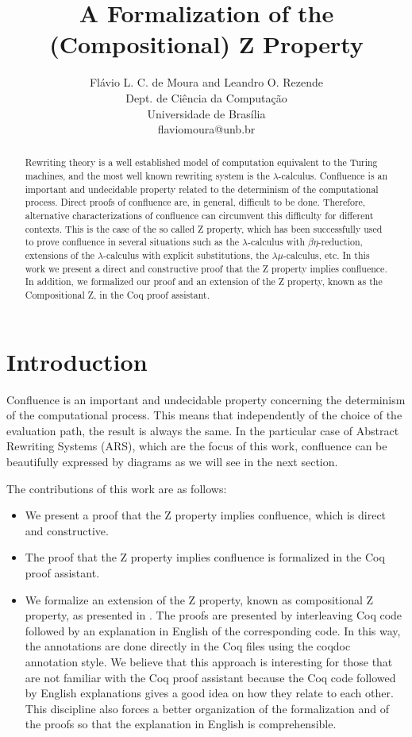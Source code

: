 \documentclass[a4paper]{article}
\title{A Formalization of the (Compositional) Z Property}
\author{
Flávio L. C. de Moura and Leandro O. Rezende\\ Dept. de Ciência da Computação\\
                Universidade de Brasília \\ flaviomoura@unb.br
}
\begin{document}
\maketitle

\begin{abstract}
  Rewriting theory is a well established model of computation
  equivalent to the Turing machines, and the most well known rewriting
  system is the $\lambda$-calculus. Confluence is an important and
  undecidable property related to the determinism of the computational
  process. Direct proofs of confluence are, in general, difficult to
  be done. Therefore, alternative characterizations of confluence can
  circumvent this difficulty for different contexts. This is the case
  of the so called Z property, which has been successfully used to
  prove confluence in several situations such as the
  $\lambda$-calculus with $\beta\eta$-reduction, extensions of the
  $\lambda$-calculus with explicit substitutions, the
  $\lambda\mu$-calculus, etc. In this work we present a direct and
  constructive proof that the Z property implies confluence.  In
  addition, we formalized our proof and an extension of the Z
  property, known as the Compositional Z, in the Coq proof assistant.
\end{abstract}
\vskip 32pt


\section{Introduction}

Confluence is an important and undecidable property concerning the
determinism of the computational process. This means that
independently of the choice of the evaluation path, the result is
always the same. In the particular case of Abstract Rewriting Systems
(ARS), which are the focus of this work, confluence can be beautifully
expressed by diagrams as we will see in the next section.

The contributions of this work are as follows:
\begin{itemize}
\item We present a proof that the Z property implies confluence,
  which is direct and constructive.
\item The proof that the Z property implies confluence is formalized
  in the Coq proof assistant. 
\item We formalize an extension of the Z property, known as
  compositional Z property, as presented in
  \cite{Nakazawa-Fujita2016}. The proofs are presented by interleaving
  Coq code followed by an explanation in English of the corresponding
  code. In this way, the annotations are done directly in the Coq
  files using the coqdoc annotation style. We believe that this
  approach is interesting for those that are not familiar with the Coq
  proof assistant because the Coq code followed by English
  explanations gives a good idea on how they relate to each
  other. This discipline also forces a better organization of the
  formalization and of the proofs so that the explanation in English
  is comprehensible.
\end{itemize}
\end{document}
